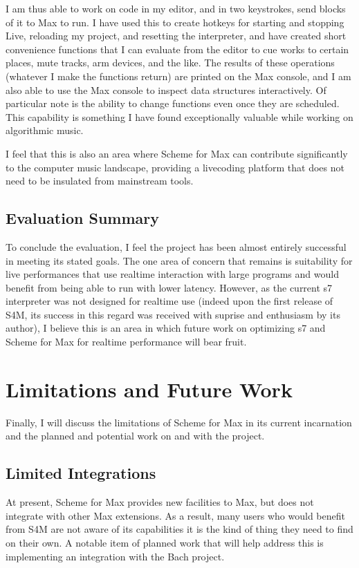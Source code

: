 \documentclass[letterpaper,10pt,english]{sphinxmanual}
\begin{document}
\sphinxAtStartPar
I am thus able to work on code in my editor, and in two keystrokes, send blocks of it to Max to run.
I have used this to create hotkeys for starting and stopping Live, reloading my project,
and resetting the interpreter, and have created short convenience functions that I can evaluate
from the editor to cue works to certain places, mute tracks, arm devices, and the like.
The results of these operations (whatever I make the functions return) are printed on the Max console,
and I am also able to use the Max console to inspect data structures interactively.
Of particular note is the ability to change functions even once they are scheduled.
This capability is something I have found exceptionally valuable while working on algorithmic music.

\sphinxAtStartPar
I feel that this is also an area where Scheme for Max can contribute significantly to the
computer music landscape, providing a live\sphinxhyphen{}coding platform that does not need to be insulated from
mainstream tools.


\subsection{Evaluation Summary}
\label{\detokenize{conclusion:evaluation-summary}}
\sphinxAtStartPar
To conclude the evaluation,  I feel the project has been almost entirely successful
in meeting its stated goals.
The one area of concern that remains is suitability for live performances that use realtime interaction with
large programs and would benefit from being able to run with lower latency.
However, as the current s7 interpreter was not designed for realtime use (indeed upon the first release
of S4M, its success in this regard was received with suprise and enthusiasm by its author),
I believe this is an area in which future work on optimizing
s7 and Scheme for Max for realtime performance will bear fruit.


\section{Limitations and Future Work}
\label{\detokenize{conclusion:limitations-and-future-work}}
\sphinxAtStartPar
Finally, I will discuss the limitations of Scheme for Max in its current incarnation and
the planned and potential work on and with the project.


\subsection{Limited Integrations}
\label{\detokenize{conclusion:limited-integrations}}
\sphinxAtStartPar
At present, Scheme for Max provides new facilities to Max, but does not integrate
with other Max extensions. As a result, many users who would benefit from S4M are
not aware of its capabilities \sphinxhyphen{} it is the kind of thing they need to find on their own.
A notable item of planned work that will help address this is implementing an integration with the Bach project.
\end{document}
